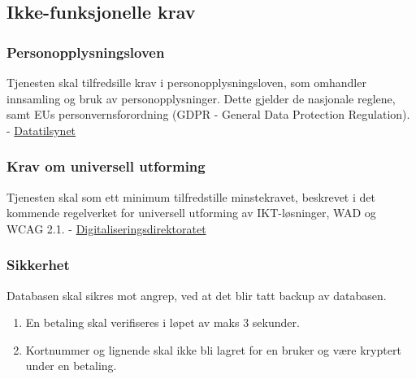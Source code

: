 

\subsection{Ikke-funksjonelle krav}
\subsubsection{Personopplysningsloven}
\label{personvern}
Tjenesten skal tilfredsille krav i personopplysningsloven, som omhandler innsamling og bruk av personopplysninger. Dette gjelder de nasjonale reglene, samt EUs personvernsforordning (GDPR - General Data Protection Regulation). \newline
- \href{https://www.datatilsynet.no/regelverk-og-verktoy/lover-og-regler/}{Datatilsynet}

\subsubsection{Krav om universell utforming}
\label{universell_u}
Tjenesten skal som ett minimum tilfredstille minstekravet, beskrevet i det kommende regelverket for universell utforming av IKT-løsninger, WAD og WCAG 2.1.\newline 
- \href{https://uu.difi.no/}{Digitaliseringsdirektoratet}



\subsubsection{Sikkerhet}
\label{sikkerhet}
Databasen skal sikres mot angrep, ved at det blir tatt backup av databasen.
\begin{enumerate}[label=(\alph*)]
    \item En betaling skal verifiseres i løpet av maks 3 sekunder. 
    \item Kortnummer og lignende skal ikke bli lagret for en bruker og være kryptert under en betaling.
\end{enumerate}

